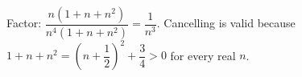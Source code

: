 Factor: $\dfrac{n\left(1+n+n^2\right)}{n^4\left(1+n+n^2\right)}=\boxed{\dfrac{1}{n^3}}$. Cancelling is valid because $1+n+n^2=\left(n+\dfrac{1}{2}\right)^2+\dfrac{3}{4}>0$ for every real $n$.
